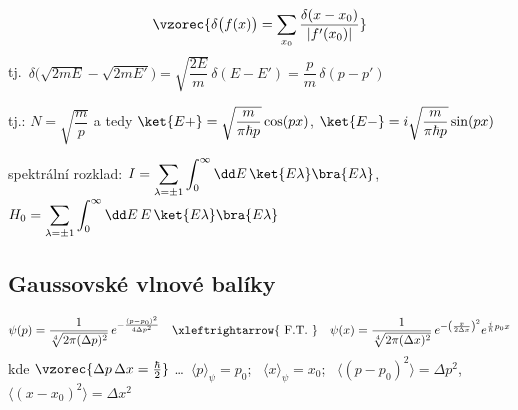 \begin{veta}
\[
  \vzorec{\delta\big(f(x)\big) = \sum_{x_0}\frac{\delta(x - x_0)}{|f'(x_0)|}}
\]
tj.\ \quad $\delta\big(\sqrt{2mE} - \sqrt{2mE'}\big) = \sqrt{\dfrac{2E}{m}}\,\delta(E - E') = \dfrac{p}{m}\,\delta(p - p')$
\end{veta}

tj.: \quad $N = \sqrt{\dfrac{m}{p}}$ \quad a tedy \quad
$\ket{E+} = \sqrt{\dfrac{m}{\pi\hbar p}}\cos(px)$, \qquad
$\ket{E-} = i\sqrt{\dfrac{m}{\pi\hbar p}}\sin(px)$

spektrální rozklad: \quad
$I = \displaystyle\sum_{\lambda=\pm1}\int_0^\infty\dd E\,\ket{E\lambda}\bra{E\lambda}$, \qquad
$H_0 = \displaystyle\sum_{\lambda=\pm1}\int_0^\infty\dd E\,E\,\ket{E\lambda}\bra{E\lambda}$

\subsection*{Gaussovské vlnové balíky}
\[
  \psi(p) = \frac{1}{\sqrt[4]{2\pi(\Delta p)^2}}\,e^{-\frac{(p-p_0)^2}{4\Delta p^2}}
  \quad\xleftrightarrow{\ \text{F.T.}\ }\quad
  \psi(x) = \frac{1}{\sqrt[4]{2\pi(\Delta x)^2}}\,e^{-\left(\frac{x}{2\Delta x}\right)^2}e^{\frac{i}{\hbar}p_0x}
\]
kde \quad $\vzorec{\Delta p\,\Delta x = \frac{\hbar}{2}}$ \quad \dots\
$\langle p\rangle_\psi = p_0$; \ $\langle x\rangle_\psi = x_0$; \ $\langle(p-p_0)^2\rangle = \Delta p^2$, \ $\langle(x-x_0)^2\rangle = \Delta x^2$

